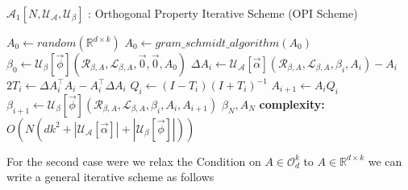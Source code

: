 \begin{algorithm}[H]
\caption{$\mathcal{A}_{1}[N,\mathcal{U_{A}},\mathcal{U_{\beta}}]$ : Orthogonal Property Iterative Scheme (OPI Scheme)}\label{lfm_orthogonal_property_iterative_scheme}
\begin{algorithmic}[1]
\State $A_{0} \gets random(\mathbb{R}^{d\times k}) $
\State $A_{0} \gets gram\_schmidt\_algorithm(A_0)$
\State $\beta_0 \gets \mathcal{U_{\beta}}[\vec{\phi}](\mathcal{R}_{\beta, A},\mathcal{L}_{\beta, A},\Vec{0},\Vec{0},A_{0})$
    \State $ \Delta A_i \gets \mathcal{U_{A}}[\vec{\alpha}](\mathcal{R}_{\beta, A},\mathcal{L}_{\beta, A},\beta_i,A_i)-A_i$
    \State $2T_i \gets \Delta A_i^\top A_i- A_i^\top \Delta A_i$
    \State $Q_i \gets (I-T_i)(I+T_i)^{-1}$
    \State $A_{i+1} \gets A_iQ_i$
    \State $\beta_{i+1} \gets \mathcal{U_{\beta}}[\vec{\phi}](\mathcal{R}_{\beta, A},\mathcal{L}_{\beta, A},\beta_{i}, A_{i}, A_{i+1})$
\EndFor
\State \Return $\beta_{N},A_{N}$
\State \textbf{complexity: } $O(N(dk^2+|\mathcal{U_{A}}[\vec{\alpha}]|+|\mathcal{U_{\beta}}[\vec{\phi}]|))$
\end{algorithmic}
\end{algorithm} For the second case were we relax the Condition on $A \in \mathcal{O}_d^k$ to $A \in \mathbb{R}^{d\times k}$ we can write a general iterative scheme as follows
